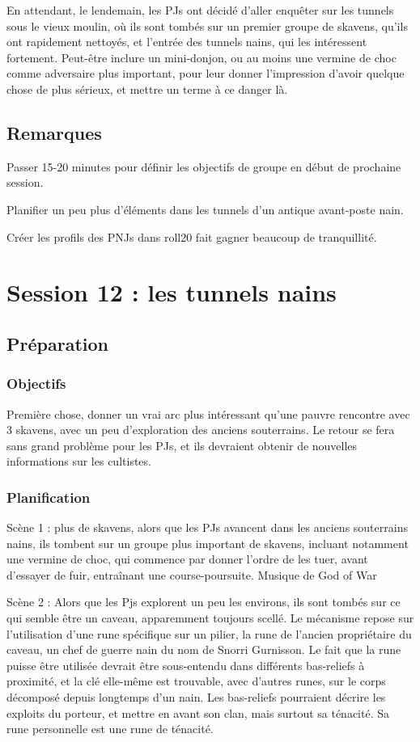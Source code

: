\documentclass[10pt,a4paper]{book}
\begin{document}
En attendant, le lendemain, les PJs ont décidé d'aller enquêter sur les tunnels sous le vieux moulin, où ils sont tombés sur un premier groupe de skavens, qu'ils ont rapidement nettoyés, et l'entrée des tunnels nains, qui les intéressent fortement. Peut-être inclure un mini-donjon, ou au moins une vermine de choc comme adversaire plus important, pour leur donner l'impression d'avoir quelque chose de plus sérieux, et mettre un terme à ce danger là.
\subsection{Remarques}
Passer 15-20 minutes pour définir les objectifs de groupe en début de prochaine session.

Planifier un peu plus d'éléments dans les tunnels d'un antique avant-poste nain.

Créer les profils des PNJs dans roll20 fait gagner beaucoup de tranquillité. 
\section{Session 12 : les tunnels nains}
\subsection{Préparation}
\subsubsection{Objectifs}
Première chose, donner un vrai arc plus intéressant qu'une pauvre rencontre avec 3 skavens, avec un peu d'exploration des anciens souterrains. Le retour se fera sans grand problème pour les PJs, et ils devraient obtenir de nouvelles informations sur les cultistes.
\subsubsection{Planification}
Scène 1 : plus de skavens, alors que les PJs avancent dans les anciens souterrains nains, ils tombent sur un groupe plus important de skavens, incluant notamment une vermine de choc, qui commence par donner l'ordre de les tuer, avant d'essayer de fuir, entraînant une course-poursuite. Musique de God of War

Scène 2 : Alors que les Pjs explorent un peu les environs, ils sont tombés sur ce qui semble être un caveau, apparemment toujours scellé. Le mécanisme repose sur l'utilisation d'une rune spécifique sur un pilier, la rune de l'ancien propriétaire du caveau, un chef de guerre nain du nom de Snorri Gurnisson. Le fait que la rune puisse être utilisée devrait être sous-entendu dans différents bas-reliefs à proximité, et la clé elle-même est trouvable, avec d'autres runes, sur le corps décomposé depuis longtemps d'un nain. Les bas-reliefs pourraient décrire les exploits du porteur, et mettre en avant son clan, mais surtout sa ténacité. Sa rune personnelle est une rune de ténacité.
\end{document}
